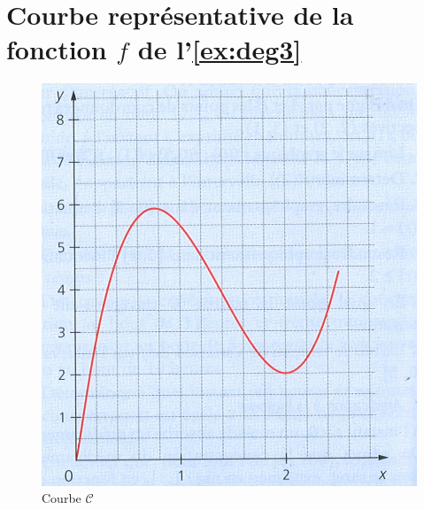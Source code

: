 \section{Courbe représentative de la fonction $f$ de l'\ref{ex:deg3}}\label{app:fig}

	\begin{figure}[h]
		
		\includegraphics[scale=0.7]{img/courbe_31}
		
		\caption{Courbe $\mathcal{C}$}
		\label{fig:c}
	\end{figure}
